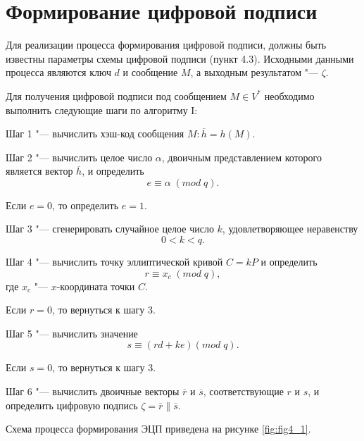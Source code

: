 \section{Формирование цифровой подписи}
\par
Для реализации процесса формирования цифровой подписи, должны быть известны параметры схемы цифровой подписи (пункт 4.3). Исходными данными процесса являются ключ $d$ и сообщение $M$, а выходным результатом "--- $\zeta$.
\par
Для получения цифровой подписи под сообщением $M\in V^{*}$ необходимо выполнить следующие шаги по алгоритму I:
\par
Шаг 1 "--- вычислить хэш-код сообщения $M\colon \overline{h} = h(M)$.
\par
Шаг 2 "--- вычислить целое число $\alpha$, двоичным представлением которого является вектор $\overline{h}$, и определить
\begin{equation*}
e\equiv \alpha\;(mod\;q).
\end{equation*}
\par
Если $e=0$, то определить $e=1$.
\par
Шаг 3 "--- сгенерировать случайное целое число $k$, удовлетворяющее неравенству
\begin{equation*}
0<k<q.
\end{equation*}
\par
Шаг 4 "--- вычислить точку эллиптической кривой $C = kP$ и определить
\begin{equation*}
r\equiv x_c\;(mod\;q),
\end{equation*}
где $x_c$ "--- $x$-координата точки $C$.
\par
Если $r=0$, то вернуться к шагу 3.
\par
Шаг 5 "--- вычислить значение
\begin{equation*}
s\equiv (rd+ke)(mod\;q).
\end{equation*}
\par
Если $s=0$, то вернуться к шагу 3.
\par
Шаг 6 "--- вычислить двоичные векторы $\overline{r}$ и $\overline{s}$, соответствующие $r$ и $s$, и определить цифровую подпись $\zeta = \overline{r}\|\overline{s}$.
\par
Схема процесса формирования ЭЦП приведена на рисунке \ref{fig:fig4_1}.
